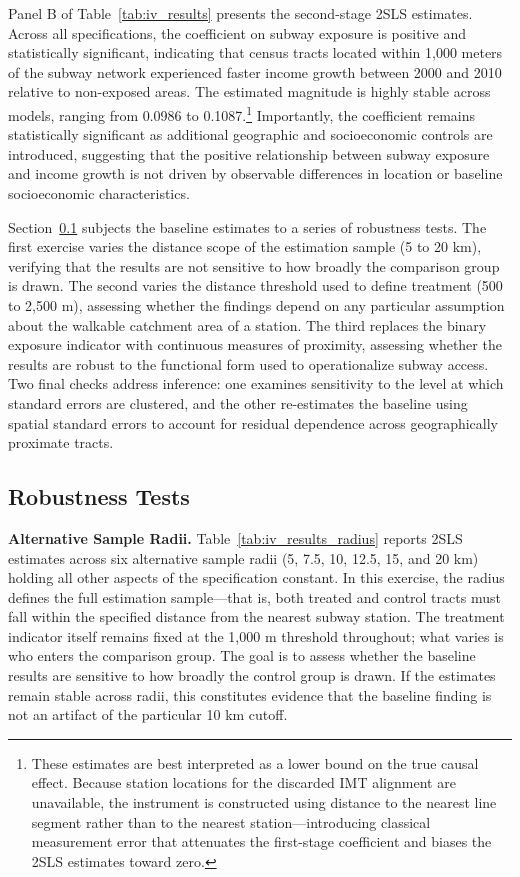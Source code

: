 Panel B of Table~\ref{tab:iv_results} presents the second-stage 2SLS estimates. Across all specifications, the coefficient on subway exposure is positive and statistically significant, indicating that census tracts located within 1,000 meters of the subway network experienced faster income growth between 2000 and 2010 relative to non-exposed areas. The estimated magnitude is highly stable across models, ranging from 0.0986 to 0.1087.\footnote{These estimates are best interpreted as a lower bound on the true causal effect. Because station locations for the discarded IMT alignment are unavailable, the instrument is constructed using distance to the nearest line segment rather than to the nearest station---introducing classical measurement error that attenuates the first-stage coefficient and biases the 2SLS estimates toward zero.} Importantly, the coefficient remains statistically significant as additional geographic and socioeconomic controls are introduced, suggesting that the positive relationship between subway exposure and income growth is not driven by observable differences in location or baseline socioeconomic characteristics.

Section~\ref{sub:results2} subjects the baseline estimates to a series of robustness tests. The first exercise varies the distance scope of the estimation sample (5 to 20 km), verifying that the results are not sensitive to how broadly the comparison group is drawn. The second varies the distance threshold used to define treatment (500 to 2,500 m), assessing whether the findings depend on any particular assumption about the walkable catchment area of a station. The third replaces the binary exposure indicator with continuous measures of proximity, assessing whether the results are robust to the functional form used to operationalize subway access. Two final checks address inference: one examines sensitivity to the level at which standard errors are clustered, and the other re-estimates the baseline using \citet{conley1999gmm} spatial standard errors to account for residual dependence across geographically proximate tracts.

\subsection{Robustness Tests}
\label{sub:results2}

\noindent
\textbf{Alternative Sample Radii.} Table~\ref{tab:iv_results_radius} reports 2SLS estimates across six alternative sample radii (5, 7.5, 10, 12.5, 15, and 20 km) holding all other aspects of the specification constant. In this exercise, the radius defines the full estimation sample---that is, both treated and control tracts must fall within the specified distance from the nearest subway station. The treatment indicator itself remains fixed at the 1,000 m threshold throughout; what varies is who enters the comparison group. The goal is to assess whether the baseline results are sensitive to how broadly the control group is drawn. If the estimates remain stable across radii, this constitutes evidence that the baseline finding is not an artifact of the particular 10 km cutoff.

